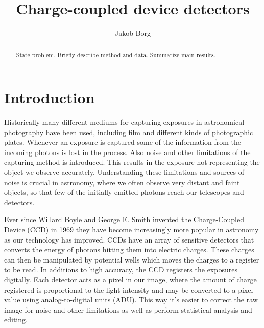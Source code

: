 \documentclass{emulateapj}
\begin{document}
\title{Charge-coupled device detectors}

\author{Jakob Borg}


  
\begin{abstract}
  State problem. Briefly describe method and data. Summarize main results.
\end{abstract}

\section{Introduction}
\label{sec:introduction}
Historically many different mediums for capturing exposures in astronomical photography have been used, including film and different kinds of photographic plates. Whenever an exposure is captured some of the information from the incoming photons is lost in the process. Also noise and other limitations of the capturing method is introduced. This results in the exposure not representing the object we observe accurately. Understanding these limitations and sources of noise is crucial in astronomy, where we often observe very distant and faint objects, so that few of the initially emitted photons reach our telescopes and detectors.

Ever since Willard Boyle and George E. Smith invented the Charge-Coupled Device (CCD) in 1969 \citep{PattentCCD} they have become increasingly more popular in astronomy as our technology has improved. CCDs have an array of sensitive detectors that converts the energy of photons hitting them into electric charges. These charges can then be manipulated by potential wells which moves the charges to a register to be read. In additions to high accuracy, the CCD registers the exposures digitally. Each detector acts as a pixel in our image, where the amount of charge registered is proportional to the light intensity and may be converted to a pixel value using analog-to-digital units (ADU). This way it's easier to correct the raw image for noise and other limitations as well as perform statistical analysis and editing.
\end{document}
